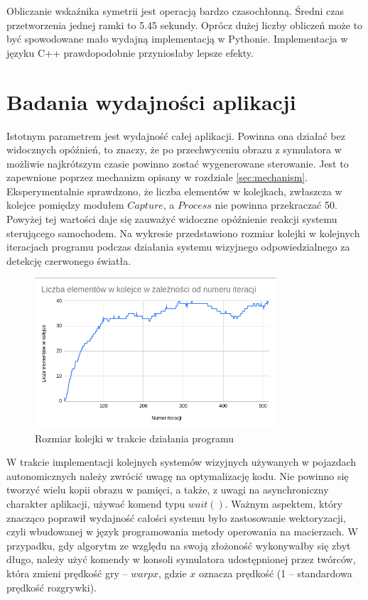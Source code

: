 Obliczanie wskaźnika symetrii jest operacją bardzo czasochłonną. 
Średni czas przetworzenia jednej ramki to 5.45 sekundy. 
Oprócz dużej liczby obliczeń może to być spowodowane mało wydajną implementacją w Pythonie. 
Implementacja w języku C++ prawdopodobnie przyniosłaby lepsze efekty.

\section{Badania wydajności aplikacji}

Istotnym parametrem jest wydajność całej aplikacji. 
Powinna ona działać bez widocznych opóźnień, to znaczy, że po przechwyceniu obrazu z symulatora w możliwie najkrótszym czasie powinno zostać wygenerowane sterowanie. 
Jest to zapewnione poprzez mechanizm opisany w rozdziale \ref{sec:mechanism}. 
Eksperymentalnie sprawdzono, że liczba elementów w kolejkach, zwłaszcza w kolejce pomiędzy modułem $Capture$, a $Process$ nie powinna przekraczać 50. 
Powyżej tej wartości daje się zauważyć widoczne opóźnienie reakcji systemu sterującego samochodem. 
Na wykresie przedstawiono rozmiar kolejki w kolejnych iteracjach programu podczas działania systemu wizyjnego odpowiedzialnego za detekcję czerwonego światła.

\begin{figure}
  \centering
  \includegraphics[width=9cm]{img/queue_stats.png}
  \caption{Rozmiar kolejki w trakcie działania programu}
  \label{fig:queue_stats}
\end{figure}

W trakcie implementacji kolejnych systemów wizyjnych używanych w pojazdach autonomicznych należy zwrócić uwagę na optymalizację kodu. 
Nie powinno się tworzyć wielu kopii obrazu w pamięci, a także, z uwagi na asynchroniczny charakter aplikacji,  używać komend typu $wait()$. 
Ważnym aspektem, który znacząco poprawił wydajność całości systemu było zastosowanie wektoryzacji, czyli wbudowanej w język programowania metody operowania na macierzach. 
W przypadku, gdy algorytm ze względu na swoją złożoność wykonywałby się zbyt długo, należy użyć komendy w konsoli symulatora udostępnionej przez twórców, która zmieni prędkość gry -- $warp x$, gdzie $x$ oznacza prędkość (1 -- standardowa prędkość rozgrywki).

